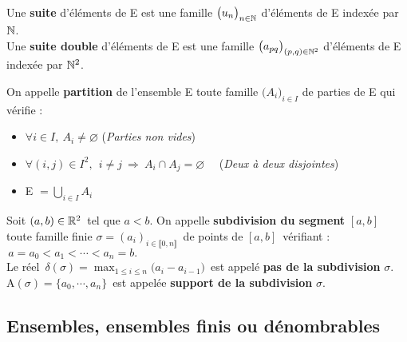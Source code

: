 \vspace{1cm}

\noindent Une \textbf{suite} d'éléments de E est une famille \(\bigl(u_n\bigr)_{n\in \mathbb{N}}\) d'éléments de E indexée par \(\mathbb{N}\).\vspace{0.1cm} \\
Une \textbf{suite double} d'éléments de E est une famille \(\bigl(a_{pq}\bigr)_{(p,q)\in \mathbb{N} ^2}\) d'éléments de E indexée par \(\mathbb{N} ^2\).

\newpage

\noindent On appelle \textbf{partition} de l'ensemble E toute famille \(\bigl(A_i\bigr)_{i\in I}\) de parties de E qui vérifie :
\begin{itemize}[leftmargin=2cm]
    \item[\lce] \(\forall i\in I,\ A_i \neq \varnothing \) \hspace{3.9cm} (\emph{Parties non vides})

    \item[\lce] \(\forall (i,j)\in I^2,\ \ i\neq j\ \Rightarrow \ A_i \cap A_j = \varnothing \) \ \ (\emph{Deux à deux disjointes})

    \item[\lce] E  \(=\displaystyle \bigcup _{i\in I} A_i \)
\end{itemize}

\vspace{1cm}

Soit \((a,b)\in\mathbb{R}^2\,\) tel que $a<b$. On appelle \textbf{subdivision du segment} $[a,b]\,$ toute famille finie \(\sigma=(a_i)_{i\in \llbracket 0,n \rrbracket}\,\) de points de $[a,b]\,$ vérifiant : \(\, a=a_0<a_1<\cdots<a_n=b.\)\vspace{0.2cm}\\
Le réel \(\, \displaystyle \delta( \sigma )=\max_{1\leq i \leq n}\bigl(a_i-a_{i-1}\bigr)\, \) est appelé \textbf{pas de la subdivision} $\sigma$.\vspace{0.2cm}\\
A\((\sigma)=\{a_0,\cdots,a_n\}\,\) est appelée \textbf{support de la subdivision} $\sigma$.


\vspace{1cm}



\subsection[Ensembles]{Ensembles, ensembles finis ou dénombrables}

